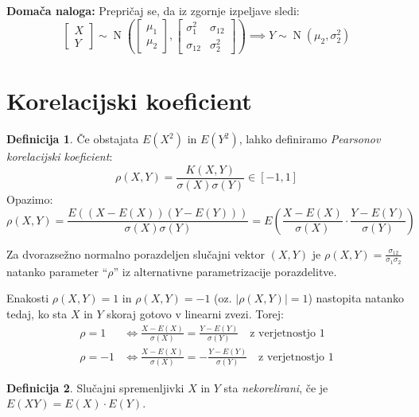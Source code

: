\documentclass[12pt]{book}
\def\n{\noindent}
\theoremstyle{definition}
\newtheorem{definicija}{Definicija}
\theoremstyle{plain}
\theoremstyle{plain}
\theoremstyle{plain}
\theoremstyle{plain}
\theoremstyle{remark}
\begin{document}
\n \textbf{Domača naloga:} Prepričaj se, da iz zgornje izpeljave sledi:
$$
\begin{bmatrix}
    X \\
    Y
    \end{bmatrix} \sim \operatorname{N}\left(\begin{bmatrix}
    \mu_1 \\
    \mu_2
    \end{bmatrix},\begin{bmatrix}
    \sigma_1^2 & \sigma_{12} \\
    \sigma_{12} & \sigma_2^2
    \end{bmatrix}\right) \implies Y \sim \operatorname{N}\left(\mu_2, \sigma_2^2\right)
$$

\section{Korelacijski koeficient}

\begin{definicija}
    Če obstajata $E\left(X^2\right)$ in $E\left(Y^2\right)$, lahko definiramo \emph{Pearsonov korelacijski koeficient}: 
    $$
    \rho(X, Y)=\frac{K(X, Y)}{\sigma(X) \sigma(Y)} \in [-1, 1]
    $$
    Opazimo: 
    $$
    \rho(X, Y)=\frac{E((X-E(X)) (Y-E(Y)))}{\sigma(X) \sigma(Y)} = E\left(\frac{X-E(X)}{\sigma(X)} \cdot \frac{Y-E(Y)}{\sigma(Y)}\right)
    $$
\end{definicija}

\begin{zgled}
    Za dvorazsežno normalno porazdeljen slučajni vektor $(X,Y)$ je $\rho(X, Y)=\frac{\sigma_{12}}{\sigma_1 \sigma_2}$ natanko parameter “$\rho$” iz alternativne parametrizacije porazdelitve. 
\end{zgled}

\n Enakosti $\rho(X, Y)=1$ in $\rho(X, Y)=-1$ (oz. $|\rho(X, Y)|=1$) nastopita natanko tedaj, ko sta $X$ in $Y$ skoraj gotovo v linearni zvezi. Torej:
$$
\begin{aligned}
    \rho=1 &\iff \frac{X-E(X)}{\sigma(X)}=\frac{Y-E(Y)}{\sigma(Y)} \quad \text {z verjetnostjo 1} \\
    \rho=-1 &\iff \frac{X-E(X)}{\sigma(X)}=-\frac{Y-E(Y)}{\sigma(Y)} \quad \text {z verjetnostjo 1}
\end{aligned}
$$

\begin{definicija}
    Slučajni spremenljivki $X$ in $Y$ sta \emph{nekorelirani}, če je $E(XY) = E(X) \cdot E(Y)$. 
\end{definicija}
\end{document}
